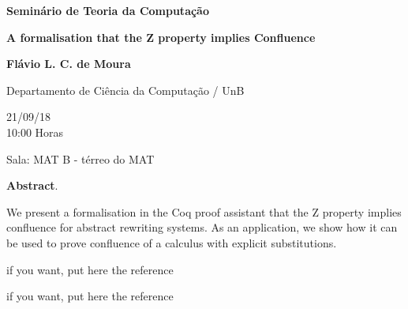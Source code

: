\documentclass[12pt,a4paper]{article}
\newcommand{\area}{Teoria da Computação}
\newcommand{\hora}{ 10:00 }
\newcommand{\local}{Sala: MAT B - térreo do MAT}
\newcommand{\dia}{21/09/18}
\newcommand{\titulo}{A formalisation that the Z property implies Confluence}
\newcommand{\palestrante}{Flávio L. C. de Moura}
\newcommand{\universidade}{Departamento de Ciência da Computação / UnB}
\begin{document}
\pagestyle{empty}

\bigskip

\begin{center}
{ \Large  {\bf\sc Semin\'ario de \area}}
\end{center}



\bigskip
\bigskip

\begin{center}

{\Large\bf \titulo}

\vspace{1cm}

{\large\bf \palestrante}

{\universidade}

\vspace{1.0cm}

\dia \\
\hora  Horas\vspace{0.2cm}

\local
\end{center}

\vspace{0.8cm}



\noindent\textbf{Abstract}. 

We present a formalisation in the Coq proof assistant that the Z
property implies confluence for abstract rewriting systems. As an
application, we show how it can be used to prove confluence of a
calculus with explicit substitutions.






\begin{thebibliography}{999}


 if you want, put here the reference

 if you want, put here the reference


\end{thebibliography}
\end{document}
